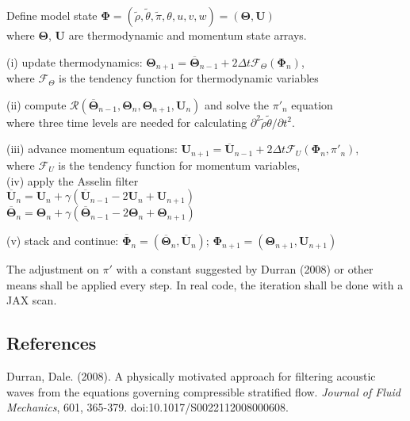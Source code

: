 \documentclass[a4paper,11pt]{article}
\begin{document}
\begin{algorithm}
\begin{tcolorbox}[parbox=false, width=38em]

    Define model state $\mathbf{\Phi} = (\tilde{\rho},\tilde{\theta},\tilde{\pi},\theta,u,v,w) = (\mathbf{\Theta}, \mathbf{U})$\\[-1ex]         
    \qquad where $\mathbf{\Theta}$, $\mathbf{U}$ are thermodynamic and momentum state arrays.\\
    
     {
        (i) update thermodynamics: $\mathbf{\Theta}_{n+1} = \overline{\mathbf{\Theta}}_{n-1} + 2\Delta t \mathcal{F}_{\Theta}(\mathbf{\Phi}_n)$,\\[-1ex]
        \qquad where $\mathcal{F}_{\Theta}$ is the tendency function for thermodynamic variables%
        
        (ii) compute $\mathcal{R}(\overline{\mathbf{\Theta}}_{n-1}, \mathbf{\Theta}_{n}, \mathbf{\Theta}_{n+1}, \mathbf{U}_n)$ and solve the $\pi'_{n}$ equation\\[-1ex]
        \qquad where three time levels are needed for calculating $\partial^2\tilde{\rho}\tilde{\theta}/\partial t^2$. 
        
        (iii) advance momentum equations: $\mathbf{U}_{n+1} = \overline{\mathbf{U}}_{n-1} + 2\Delta t \mathcal{F}_{U}(\mathbf{\Phi}_n, \pi'_n)$,\\[-1ex]
        \qquad  where $\mathcal{F}_{U}$ is the tendency function for momentum variables,\\[-1ex]
        
        (iv) apply the Asselin filter\\[-1ex] 
\qquad $\overline{\mathbf{U}}_n = \mathbf{U}_n + \gamma (\overline{\mathbf{U}}_{n-1} - 2\mathbf{U}_n + \mathbf{U}_{n+1})$\\[-1ex]    
\qquad $\overline{\mathbf{\Theta}}_n = \mathbf{\Theta}_n + \gamma (\overline{\mathbf{\Theta}}_{n-1} - 2\mathbf{\Theta}_n + \mathbf{\Theta}_{n+1})$        

        (v) stack and continue: $\overline{\mathbf{\Phi}}_n = (\overline{\mathbf{\Theta}}_n, \overline{\mathbf{U}}_n)$; $\mathbf{\Phi}_{n+1} = (\mathbf{\Theta}_{n+1}, \mathbf{U}_{n+1})$
        }        
\end{tcolorbox}    
\end{algorithm}


The adjustment on $\pi'$ with a constant suggested by Durran (2008) or other means shall be applied every step. In real code, the iteration shall be done with a JAX \textsf{scan}.


\subsection*{References}
Durran, Dale. (2008). A physically motivated approach for filtering acoustic waves from the equations governing compressible stratified flow. \textit{Journal of Fluid Mechanics}, 601, 365-379. doi:10.1017/S0022112008000608.
\end{document}
